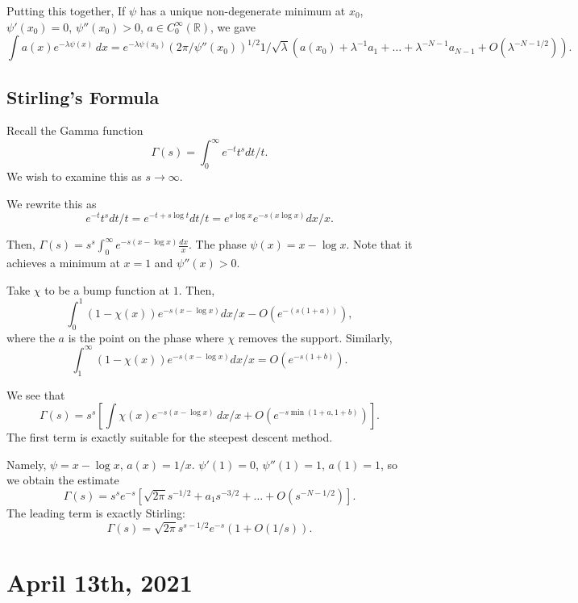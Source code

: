 \documentclass[12pt]{scrartcl}
\newcommand{\R}{\mathbb{R}}
\newcommand{\<}{\langle}
\renewcommand{\>}{\rangle}
\begin{document}
Putting this together, If $\psi$ has a unique non-degenerate minimum at $x_0$, $\psi'(x_0) = 0$, $\psi''(x_0) > 0$, $a \in C_0^\infty(\R)$, we gave
$$\int a(x) e^{-\lambda\psi(x)}\, dx = e^{-\lambda \psi(x_0)} (2\pi/\psi''(x_0))^{1/2} 1/\sqrt{\lambda} (a(x_0) + \lambda^{-1} a_1 + \dots + \lambda^{-N-1} a_{N-1} + O(\lambda^{-N - 1/2})).$$

\subsection{Stirling's Formula}
Recall the Gamma function
$$\Gamma(s) = \int_0^\infty e^{-t} t^s dt/t.$$
We wish to examine this as $s \to \infty$.

We rewrite this as 
$$e^{-t} t^s dt/t = e^{-t + s\log t} dt/t = e^{s \log x}e^{-s(x \log x)}dx/x.$$

Then, $\Gamma(s) = s^s \int_0^\infty e^{-s(x - \log x)}\frac{dx}{x}.$  The phase $\psi(x) = x - \log x$.  Note that it achieves a minimum at $x = 1$ and $\psi''(x) > 0$.

Take $\chi$ to be a bump function at $1$.  Then,
$$\int_0^1 (1 - \chi(x)) e^{-s(x - \log x)} dx/x - O(e^{-(s(1 + a))}),$$
where the $a$ is the point on the phase where $\chi$ removes the support.  Similarly,
$$\int_1^\infty (1 - \chi(x)) e^{-s(x - \log x)}dx/x = O(e^{-s(1 + b)}).$$

We see that 
$$\Gamma(s) = s^s[\int \chi(x)e^{-s(x - \log x)} \,dx/x + O(e^{-s \min(1 + a, 1 + b)})].$$
The first term is exactly suitable for the steepest descent method.  

Namely, $\psi = x - \log x$, $a(x) = 1/x$.  $\psi'(1) = 0$, $\psi''(1) = 1$, $a(1) = 1$, so we obtain the estimate
$$\Gamma(s) = s^s e^{-s}[ \sqrt{2\pi}s^{-1/2} + a_1 s^{-3/2} + \dots + O(s^{-N - 1/2})].$$
The leading term is exactly Stirling:
$$\Gamma(s) = \sqrt{2\pi} s^{s - 1/2} e^{-s}(1 + O(1/s)).$$



\pagebreak
\section{April 13th, 2021}
\end{document}
